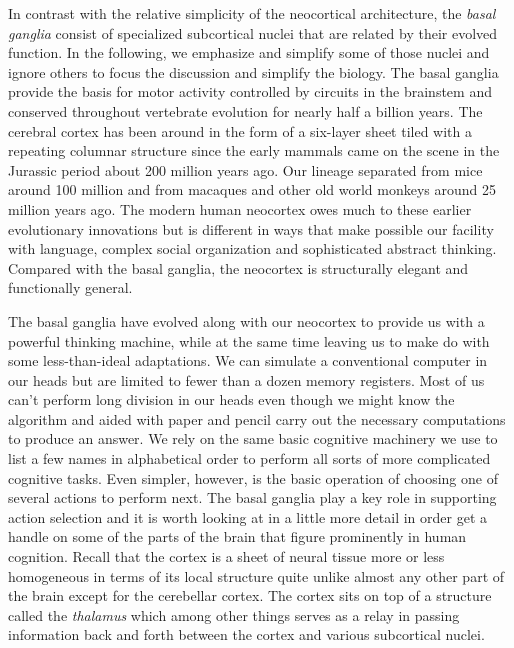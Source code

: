 In contrast with the relative simplicity of the neocortical architecture, the {\it{basal ganglia}} consist of specialized subcortical nuclei that are related by their evolved function. In the following, we emphasize and simplify some of those nuclei and ignore others to focus the discussion and simplify the biology. The basal ganglia provide the basis for motor activity controlled by circuits in the brainstem and conserved throughout vertebrate evolution for nearly half a billion years. The cerebral cortex has been around in the form of a six-layer sheet tiled with a repeating columnar structure since the early mammals came on the scene in the Jurassic period about 200 million years ago. Our lineage separated from mice around 100 million and from macaques and other old world monkeys around 25 million years ago. The modern human neocortex owes much to these earlier evolutionary innovations but is different in ways that make possible our facility with language, complex social organization and sophisticated abstract thinking. Compared with the basal ganglia, the neocortex is structurally elegant and functionally general.

The basal ganglia have evolved along with our neocortex to provide us with a powerful thinking machine, while at the same time leaving us to make do with some less-than-ideal adaptations. We can simulate a conventional computer in our heads but are limited to fewer than a dozen memory registers. Most of us can't perform long division in our heads even though we might know the algorithm and aided with paper and pencil carry out the necessary computations to produce an answer. We rely on the same basic cognitive machinery we use to list a few names in alphabetical order to perform all sorts of more complicated cognitive tasks. Even simpler, however, is the basic operation of choosing one of several actions to perform next. The basal ganglia play a key role in supporting action selection and it is worth looking at in a little more detail in order get a handle on some of the parts of the brain that figure prominently in human cognition. Recall that the cortex is a sheet of neural tissue more or less homogeneous in terms of its local structure quite unlike almost any other part of the brain except for the cerebellar cortex. The cortex sits on top of a structure called the {\it{thalamus}} which among other things serves as a relay in passing information back and forth between the cortex and various subcortical nuclei.


